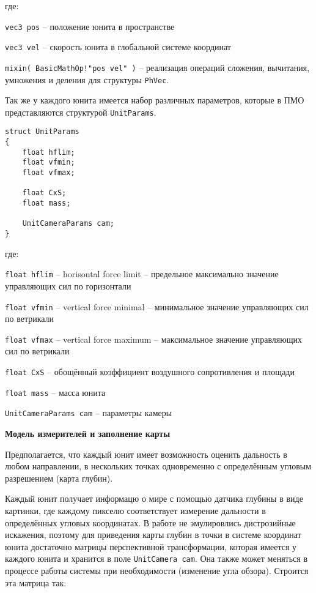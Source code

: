 где:

\verb|vec3 pos| -- положение юнита в пространстве

\verb|vec3 vel| -- скорость юнита в глобальной системе координат

\verb|mixin( BasicMathOp!"pos vel" )| -- реализация операций сложения,
вычитания, умножения и деления для структуры \verb|PhVec|.

Так же у каждого юнита имеется набор различных параметров, которые в
ПМО представляются структурой \verb|UnitParams|.

\begin{verbatim}
struct UnitParams
{
    float hflim;
    float vfmin;
    float vfmax;

    float CxS;
    float mass;

    UnitCameraParams cam;
}
\end{verbatim}

где: 

\verb|float hflim| -- horisontal force limit -- предельное максимально
значение управляющих сил по горизонтали

\verb|float vfmin| -- vertical force minimal -- минимальное значение
управляющих сил по ветрикали

\verb|float vfmax| -- vertical force maximum -- максимальное значение
управляющих сил по ветрикали

\verb|float CxS| -- обощённый коэффициент воздушного сопротивления и
площади

\verb|float mass| -- масса юнита

\verb|UnitCameraParams cam| -- параметры камеры

\newpage
\textbf{Модель измерителей и заполнение карты}

Предполагается, что каждый юнит имеет возможность оценить дальность
в любом направлении, в нескольких точках одновременно с определённым
угловым разрешением (карта глубин).

Каждый юнит получает информацю о мире с помощью датчика глубины в виде картинки,
где каждому пикселю соответствует измерение дальности в определённых угловых
координатах. В работе не эмулировлись дистрозийные искажения, поэтому для
приведения карты глубин в точки в системе координат юнита достаточно матрицы
перспективной трансформации, которая имеется у каждого юнита и хранится в
поле \verb|UnitCamera cam|. Она также может меняться в процессе работы
системы при необходимости (изменение угла обзора). Строится эта матрица так:

